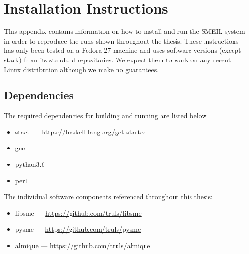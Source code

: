 \chapter{Installation Instructions}
\label{app:inst}

This appendix contains information on how to install and run the SMEIL system in
order to reproduce the runs shown throughout the thesis. These instructions has
only been tested on a Fedora 27 machine and uses software versions (except
stack) from its standard repositories. We expect them to work on any recent
Linux distribution although we make no guarantees.



\section{Dependencies}
The required dependencies for building and running are listed below
\begin{itemize}
\item {\ttfamily stack} --- \url{https://haskell-lang.org/get-started}
\item gcc
\item python3.6
\item perl
\end{itemize}

\noindent The individual software components referenced throughout this thesis:

\begin{itemize}
\item libsme --- \url{https://github.com/truls/libsme}
\item pysme --- \url{https://github.com/truls/pysme}
\item almique --- \url{https://github.com/truls/almique}
\end{itemize}




